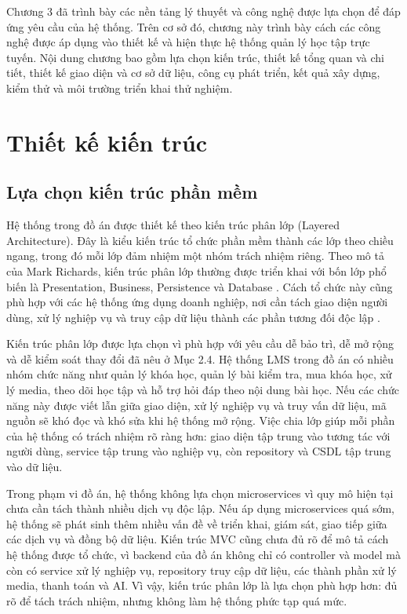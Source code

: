 \documentclass[../DoAn.tex]{subfiles}
\begin{document}
Chương 3 đã trình bày các nền tảng lý thuyết và công nghệ được lựa chọn để đáp ứng yêu cầu của hệ thống. Trên cơ sở đó, chương này trình bày cách các công nghệ được áp dụng vào thiết kế và hiện thực hệ thống quản lý học tập trực tuyến. Nội dung chương bao gồm lựa chọn kiến trúc, thiết kế tổng quan và chi tiết, thiết kế giao diện và cơ sở dữ liệu, công cụ phát triển, kết quả xây dựng, kiểm thử và môi trường triển khai thử nghiệm.

\section{Thiết kế kiến trúc}
\subsection{Lựa chọn kiến trúc phần mềm}
Hệ thống trong đồ án được thiết kế theo kiến trúc phân lớp (Layered Architecture). Đây là kiểu kiến trúc tổ chức phần mềm thành các lớp theo chiều ngang, trong đó mỗi lớp đảm nhiệm một nhóm trách nhiệm riêng. Theo mô tả của Mark Richards, kiến trúc phân lớp thường được triển khai với bốn lớp phổ biến là Presentation, Business, Persistence và Database \cite{richards2015softwareArchitecturePatterns}. Cách tổ chức này cũng phù hợp với các hệ thống ứng dụng doanh nghiệp, nơi cần tách giao diện người dùng, xử lý nghiệp vụ và truy cập dữ liệu thành các phần tương đối độc lập \cite{fowler2002poeaa}.

Kiến trúc phân lớp được lựa chọn vì phù hợp với yêu cầu dễ bảo trì, dễ mở rộng và dễ kiểm soát thay đổi đã nêu ở Mục 2.4. Hệ thống LMS trong đồ án có nhiều nhóm chức năng như quản lý khóa học, quản lý bài kiểm tra, mua khóa học, xử lý media, theo dõi học tập và hỗ trợ hỏi đáp theo nội dung bài học. Nếu các chức năng này được viết lẫn giữa giao diện, xử lý nghiệp vụ và truy vấn dữ liệu, mã nguồn sẽ khó đọc và khó sửa khi hệ thống mở rộng. Việc chia lớp giúp mỗi phần của hệ thống có trách nhiệm rõ ràng hơn: giao diện tập trung vào tương tác với người dùng, service tập trung vào nghiệp vụ, còn repository và CSDL tập trung vào dữ liệu.

Trong phạm vi đồ án, hệ thống không lựa chọn microservices vì quy mô hiện tại chưa cần tách thành nhiều dịch vụ độc lập. Nếu áp dụng microservices quá sớm, hệ thống sẽ phát sinh thêm nhiều vấn đề về triển khai, giám sát, giao tiếp giữa các dịch vụ và đồng bộ dữ liệu. Kiến trúc MVC cũng chưa đủ rõ để mô tả cách hệ thống được tổ chức, vì backend của đồ án không chỉ có controller và model mà còn có service xử lý nghiệp vụ, repository truy cập dữ liệu, các thành phần xử lý media, thanh toán và AI. Vì vậy, kiến trúc phân lớp là lựa chọn phù hợp hơn: đủ rõ để tách trách nhiệm, nhưng không làm hệ thống phức tạp quá mức.
\end{document}
